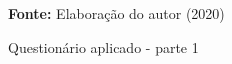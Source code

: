 \begin{figure}[ht!]
\centering

\caption{\textmd{Questionário aplicado - parte 1}}
\label{fig:questionario1}

\par\medskip\textbf{Fonte:} Elaboração do autor (2020) \par\medskip

\end{figure}
